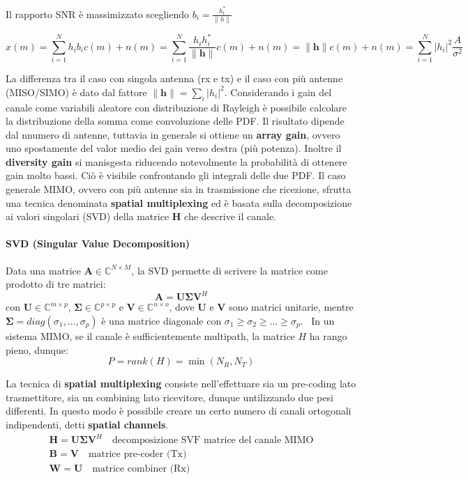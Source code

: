 Il rapporto SNR è massimizzato scegliendo $b_i = \frac{h_i^*}{ \| h \| }$

\[
    x(m) = \sum_{i=1}^{N} h_i b_i c(m) + n(m) = \sum_{i=1}^{N} \frac{h_i h_i^*}{\| \mathbf{h} \|} c(m) + n(m) = \| \mathbf{h} \| c(m) + n(m) = \sum_{i=1}^{N} |h_i|^2 \frac{A}{\sigma^2}
\]

La differenza tra il caso con singola antenna (rx e tx) e il caso con più antenne (MISO/SIMO) è dato dal fattore $\| \mathbf{h} \| = \sum_{i} |h_i|^2$.
Considerando i gain del canale come variabili aleatore con distribuzione di Rayleigh è possibile calcolare la distribuzione della somma come convoluzione delle PDF.
Il risultato dipende dal nnumero di antenne, tuttavia in generale si ottiene un \textbf{array gain}, ovvero uno spostamente del valor medio dei gain verso destra (più potenza). Inoltre il \textbf{diversity gain} si manisgesta riducendo notevolmente la probabilità di ottenere gain molto bassi. Ciò è visibile confrontando gli integrali delle due PDF.
Il caso generale MIMO, ovvero con più antenne sia in trasmissione che ricezione, sfrutta una tecnica denominata \textbf{spatial multiplexing} ed è basata sulla decomposizione ai valori singolari (SVD) della matrice $\mathbf{H}$ che descrive il canale.

\paragraph*{SVD (Singular Value Decomposition)}

Data una matrice $\mathbf{A} \in \mathbb{C}^{N \times M}$, la SVD permette di scrivere la matrice come prodotto di tre matrici:
\[
    \mathbf{A} = \mathbf{U} \mathbf{\Sigma} \mathbf{V}^H
\]
con $\mathbf{U} \in \mathbb{C}^{m \times p}$, $\mathbf{\Sigma} \in \mathbb{C}^{p \times p}$ e $\mathbf{V} \in \mathbb{C}^{n \times o}$,
dove $\mathbf{U}$ e $\mathbf{V}$ sono matrici unitarie, mentre $\mathbf{\Sigma} = diag(\sigma_1, \ldots, \sigma_p)$ è una matrice diagonale con $\sigma_1 \geq \sigma_2 \geq \ldots \geq \sigma_p$. 
\
In un sistema MIMO, se il canale è sufficientemente multipath, la matrice $H$ ha rango pieno, dunque:
\[
    P = rank(H) = \min(N_R, N_T)
\]

La tecnica di \textbf{spatial multiplexing} consiste nell'effettuare sia un pre-coding lato trasmettitore, sia un combining lato ricevitore, dunque untilizzando due pesi differenti. In questo modo è possibile creare un certo numero di canali ortogonali indipendenti, detti \textbf{spatial channels}.
\[
    \begin{array}{ll}
        \mathbf{H} = \mathbf{U} \mathbf{\Sigma} \mathbf{V}^H \quad \text{decomposizione SVF matrice del canale MIMO} \\
        \mathbf{B} = \mathbf{V} \quad \text{matrice pre-coder (Tx)} \\
        \mathbf{W} = \mathbf{U} \quad \text{matrice combiner (Rx)}
    \end{array}
\]


